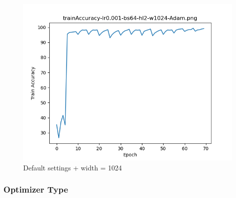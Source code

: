\documentclass{article}[12pt]
\begin{document}
    \begin{figure}[H]
        \includegraphics[width=\linewidth]{testsResults/trainAccuracy/trainAccuracy-lr0.001-bs64-hl2-w1024-Adam.png}
        \caption{Default settings + width = 1024}
        \endminipage
    \end{figure}

\subsubsection{Optimizer Type}
\end{document}
